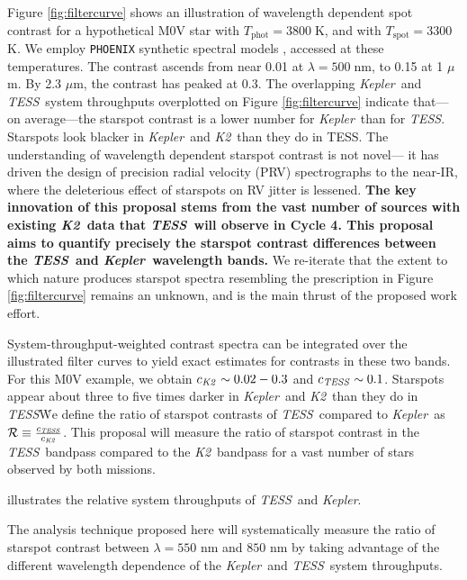 \documentclass[letterpaper,12pt]{article}
\newcommand{\tess}{{\it TESS}}
\newcommand{\kepler}{{\it Kepler}}
\newcommand{\ktwo}{{\it K2}}
\begin{document}
Figure \ref{fig:filtercurve} shows an illustration of wavelength dependent spot contrast for a hypothetical M0V star with $T_\text{phot}=3800\;$K, and with $T_\text{spot}=3300\;$K.  We employ \texttt{PHOENIX} synthetic spectral models \cite{2013A&A...553A...6H}, accessed at these temperatures.  The contrast ascends from near 0.01 at $\lambda=500\;$nm, to 0.15 at 1 $\mu$m.  By 2.3 $\mu$m, the contrast has peaked at 0.3.  The overlapping \kepler\ and \tess\ system throughputs overplotted on Figure \ref{fig:filtercurve} indicate that---on average---the starspot contrast is a lower number for \kepler\ than for \tess.  Starspots look blacker in \kepler\ and \ktwo\ than they do in TESS.  The understanding of wavelength dependent starspot contrast is not novel--- it has driven the design of precision radial velocity (PRV) spectrographs to the near-IR, where the deleterious effect of starspots on RV jitter is lessened.  \textbf{The key innovation of this proposal stems from the vast number of sources with existing \ktwo\ data that \tess\ will observe in Cycle 4.  This proposal aims to quantify precisely the starspot contrast differences between the \tess\ and \kepler\ wavelength bands.}  We re-iterate that the extent to which nature produces starspot spectra resembling the prescription in Figure \ref{fig:filtercurve} remains an unknown, and is the main thrust of the proposed work effort.  

System-throughput-weighted contrast spectra can be integrated over the illustrated filter curves to yield exact estimates for contrasts in these two bands.  For this M0V example, we obtain $c_{\ktwo}\sim0.02-0.3$ and $c_{\tess}\sim0.1$.  Starspots appear about three to five times darker in \kepler\ and \ktwo\ than they do in \tess\.  We define the ratio of starspot contrasts of \tess\ compared to \kepler\ as $\mathcal{R}\equiv \frac{c_{\tess}}{c_{\ktwo}}$.  This proposal will measure the ratio of starspot contrast in the \tess\ bandpass compared to the \ktwo\ bandpass for a vast number of stars observed by both missions.






illustrates the relative system throughputs of \tess\ and \kepler.  


The analysis technique proposed here will systematically measure the ratio of starspot contrast between $\lambda = 550$ nm and $850$ nm by taking advantage of the different wavelength dependence of the \kepler\ and \tess\ system throughputs.

\end{document}

